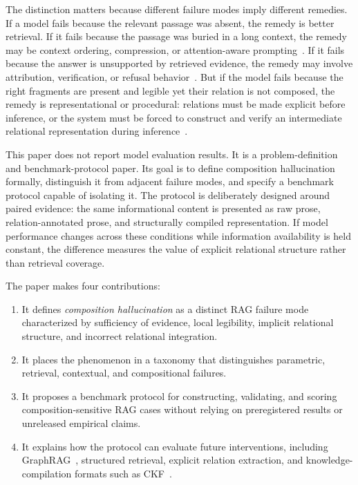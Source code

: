 \documentclass[11pt]{article}
\begin{document}
The distinction matters because different failure modes imply different remedies. If a model fails because the relevant passage was absent, the remedy is better retrieval. If it fails because the passage was buried in a long context, the remedy may be context ordering, compression, or attention-aware prompting~\cite{liu2024lost}. If it fails because the answer is unsupported by retrieved evidence, the remedy may involve attribution, verification, or refusal behavior~\cite{asai2024selfrag,niu2024ragtruth}. But if the model fails because the right fragments are present and legible yet their relation is not composed, the remedy is representational or procedural: relations must be made explicit before inference, or the system must be forced to construct and verify an intermediate relational representation during inference~\cite{davis1993kr,tomazinho2026ckf}.

This paper does not report model evaluation results. It is a problem-definition and benchmark-protocol paper. Its goal is to define composition hallucination formally, distinguish it from adjacent failure modes, and specify a benchmark protocol capable of isolating it. The protocol is deliberately designed around paired evidence: the same informational content is presented as raw prose, relation-annotated prose, and structurally compiled representation. If model performance changes across these conditions while information availability is held constant, the difference measures the value of explicit relational structure rather than retrieval coverage.

The paper makes four contributions:

\begin{enumerate}[leftmargin=*,itemsep=2pt]
    \item It defines \emph{composition hallucination} as a distinct RAG failure mode characterized by sufficiency of evidence, local legibility, implicit relational structure, and incorrect relational integration.
    \item It places the phenomenon in a taxonomy that distinguishes parametric, retrieval, contextual, and compositional failures.
    \item It proposes a benchmark protocol for constructing, validating, and scoring composition-sensitive RAG cases without relying on preregistered results or unreleased empirical claims.
    \item It explains how the protocol can evaluate future interventions, including GraphRAG~\cite{edge2024graphrag}, structured retrieval, explicit relation extraction, and knowledge-compilation formats such as CKF~\cite{tomazinho2026ckf}.
\end{enumerate}
\end{document}
